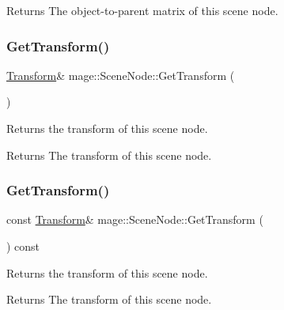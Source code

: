 \begin{DoxyReturn}{Returns}
The object-\/to-\/parent matrix of this scene node. 
\end{DoxyReturn}
\hypertarget{classmage_1_1_scene_node_a72bfe51e9f233dd35fd8affd24b0a67a}{}\label{classmage_1_1_scene_node_a72bfe51e9f233dd35fd8affd24b0a67a} 
\subsubsection{\texorpdfstring{Get\+Transform()}{GetTransform()}\hspace{0.1cm}{\footnotesize\ttfamily [1/2]}}
{\footnotesize\ttfamily \hyperlink{structmage_1_1_transform}{Transform}\& mage\+::\+Scene\+Node\+::\+Get\+Transform (\begin{DoxyParamCaption}{ }\end{DoxyParamCaption})}

Returns the transform of this scene node.

\begin{DoxyReturn}{Returns}
The transform of this scene node. 
\end{DoxyReturn}
\hypertarget{classmage_1_1_scene_node_ab68ffa4886e8e5ff9757362823a1aa74}{}\label{classmage_1_1_scene_node_ab68ffa4886e8e5ff9757362823a1aa74} 
\subsubsection{\texorpdfstring{Get\+Transform()}{GetTransform()}\hspace{0.1cm}{\footnotesize\ttfamily [2/2]}}
{\footnotesize\ttfamily const \hyperlink{structmage_1_1_transform}{Transform}\& mage\+::\+Scene\+Node\+::\+Get\+Transform (\begin{DoxyParamCaption}{ }\end{DoxyParamCaption}) const}

Returns the transform of this scene node.

\begin{DoxyReturn}{Returns}
The transform of this scene node. 
\end{DoxyReturn}
\hypertarget{classmage_1_1_scene_node_a0ddba0d70a8b2ce0ef80f25673d0dd56}{}\label{classmage_1_1_scene_node_a0ddba0d70a8b2ce0ef80f25673d0dd56} 
